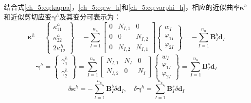 结合式\eqref{ch_5:eq:kappa}，\eqref{ch_5:eq:w_h}和\eqref{ch_5:eq:varphi_h}，相应的近似曲率$\boldsymbol\kappa^h$和近似剪切应变$\boldsymbol\gamma^h$及其变分可表示为：
\begin{equation}
    \boldsymbol\kappa^h = 
    \begin{Bmatrix}
        \kappa^h_{11} \\ \kappa^h_{22} \\ 2\kappa^h_{12} 
    \end{Bmatrix} = -\sum_{I=1}^{n_u}
    \begin{bmatrix}
        0 & N_{I,1} & 0 \\ 0 & 0 & N_{I,2} \\ 0 & N_{I,2} & N_{I,1}
    \end{bmatrix}
    \begin{Bmatrix}
        w_I \\ \varphi_{1I} \\ \varphi_{2I}
    \end{Bmatrix} = - \sum_{I=1}^{n_u} \boldsymbol B^b_I \boldsymbol d_I
\end{equation}
\begin{equation}
    \boldsymbol\gamma^h = 
    \begin{Bmatrix}
        \gamma^h_1 \\ \gamma^h_2
    \end{Bmatrix} = \sum_{I=1}^{n_u}
    \begin{bmatrix}
        N_{I,1} & N_I & 0 \\
        N_{I,2} & 0 & N_I
    \end{bmatrix}
    \begin{Bmatrix}
        w_I \\ \varphi_{1I} \\ \varphi_{2I}
    \end{Bmatrix} = \sum_{I=1}^{n_u} \boldsymbol B^s_I \boldsymbol d_I
\end{equation}
\begin{equation}\label{ch_5:eq:kappa_h}
    \delta\boldsymbol\kappa^h = - \sum_{I=1}^{n_u} \boldsymbol B^b_I \delta\boldsymbol d_I ,\quad \delta\boldsymbol\gamma^h = \sum_{I=1}^{n_u} \boldsymbol B^s_I \delta\boldsymbol d_I
\end{equation}

